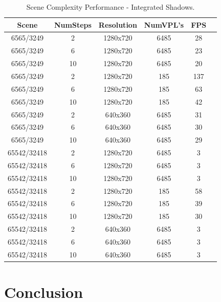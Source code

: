\begin{table}[h!]\centering
	\caption{Scene Complexity Performance - Integrated Shadows.}
	\begin{center}
	    \begin{tabular}{ | c | c | c | c | c | c |}
	    \hline
	    Scene & NumSteps & Resolution & NumVPL's & FPS\\ \hline
	    6565/3249 & 2 & 1280x720 & 6485 & 28\\ \hline
	    6565/3249 & 6 & 1280x720 & 6485 & 23\\ \hline
	    6565/3249 & 10 & 1280x720 & 6485 & 20\\ \hline
	    6565/3249 & 2 & 1280x720 & 185 & 137\\ \hline
	    6565/3249 & 6 & 1280x720 & 185 & 63\\ \hline
	    6565/3249 & 10 & 1280x720 & 185 & 42\\ \hline
	    6565/3249 & 2 & 640x360 & 6485 & 31\\ \hline
	    6565/3249 & 6 & 640x360 & 6485 & 30\\ \hline
	    6565/3249 & 10 & 640x360 & 6485 & 29\\ \hline
	    \hline
	    \hline
	    65542/32418 & 2 & 1280x720 & 6485 & 3\\ \hline
	    65542/32418 & 6 & 1280x720 & 6485 & 3\\ \hline
	    65542/32418 & 10 & 1280x720 & 6485 & 3\\ \hline
	    65542/32418 & 2 & 1280x720 & 185 & 58\\ \hline
	    65542/32418 & 6 & 1280x720 & 185 & 39\\ \hline
	    65542/32418 & 10 & 1280x720 & 185 & 30\\ \hline
	    65542/32418 & 2 & 640x360 & 6485 & 3\\ \hline
	    65542/32418 & 6 & 640x360 & 6485 & 3\\ \hline
	    65542/32418 & 10 & 640x360 & 6485 & 3\\ \hline
	    \end{tabular}
	\end{center}
	\label{table:tech2Complex}
\end{table}

\section{Conclusion}
